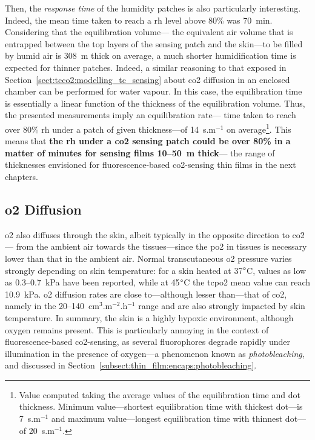 Then, the \emph{response time} of the humidity patches is also particularly interesting. Indeed, the mean time taken to reach a \gls{rh} level above 80\% was 70~min. Considering that the equilibration volume---\ie{} the equivalent air volume that is entrapped between the top layers of the sensing patch and the skin---to be filled by humid air is 308~{\textmu}m thick on average, a much shorter humidification time is expected for thinner patches. Indeed, a similar reasoning to that exposed in Section~\ref{sect:tcco2:modelling_tc_sensing} about \gls{co2} diffusion in an enclosed chamber can be performed for water vapour. In this case, the equilibration time is essentially a linear function of the thickness of the equilibration volume. Thus, the presented measurements imply an equilibration rate---\ie{} time taken to reach over 80\% \gls{rh} under a patch of given thickness---of 14~s.{\textmu}m$^{-1}$ on average\footnote{Value computed taking the average values of the equilibration time and dot thickness. Minimum value---shortest equilibration time with thickest dot---is 7~s.{\textmu}m$^{-1}$ and maximum value---longest equilibration time with thinnest dot---of 20~s.{\textmu}m$^{-1}$.}. This means that \textbf{the \gls{rh} under a \gls{co2} sensing patch could be over 80\% in a matter of minutes for sensing films 10--50~{\textmu}m thick}---\ie{} the range of thicknesses envisioned for fluorescence-based \gls{co2}-sensing thin films in the next chapters.

\subsection{\texorpdfstring{\Gls{o2}}{O2} Diffusion}\label{sect:tcco2:skin_mes:po2}

\gls{o2} also diffuses through the skin, albeit typically in the opposite direction to \gls{co2}---\ie{} from the ambient air towards the tissues---since the \gls{po2} in tissues is necessary lower than that in the ambient air. Normal transcutaneous \gls{o2} pressure varies strongly depending on skin temperature: for a skin heated at 37$\degree$C, values as low as 0.3--0.7~kPa have been reported\cite{ewald1981}, while at 45$\degree$C the \gls{tcpo2} mean value can reach 10.9~kPa\cite{wimberley1985a}. \gls{o2} diffusion rates are close to---although lesser than---that of \gls{co2}, namely in the 20--140~cm$^3$.m$^{-2}$.h$^{-1}$ range\cite{shaw1929, ernstene1932b, fitzgerald1957, levshankov1983} and are also strongly impacted by skin temperature\cite{shaw1930}. In summary, the skin is a highly hypoxic environment, although oxygen remains present. This is particularly annoying in the context of fluorescence-based \gls{co2}-sensing, as several fluorophores degrade rapidly under illumination in the presence of oxygen---a phenomenon known as \emph{photobleaching}, and discussed in Section~\ref{subsect:thin_film:encaps:photobleaching}.


